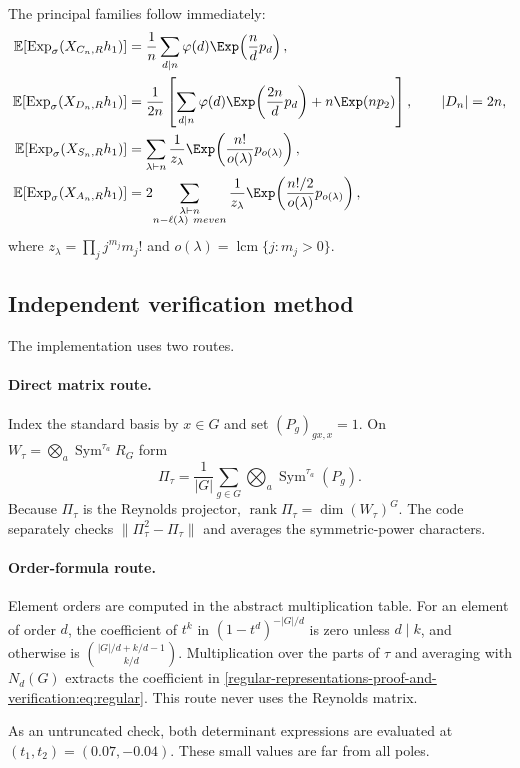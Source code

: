 \documentclass[10pt]{article}
\newcommand{\Sym}{\operatorname{Sym}}
\newcommand{\ExpS}{\operatorname{Exp}_{\sigma}}
\newcommand{\smgv}[2]{\mathbb E\!\left[\ExpS\!\left(X_{#1,#2}h_1\right)\right]}
\begin{document}
The principal families follow immediately:
\begin{align*}
 \smgv{C_n}{R}&=\frac1n\sum_{d\mid n}\varphi(d)
       \Exp\!\left(\frac ndp_d\right),\\
 \smgv{D_n}{R}&=\frac1{2n}\left[
   \sum_{d\mid n}\varphi(d)\Exp\!\left(\frac{2n}{d}p_d\right)
   +n\Exp(np_2)\right],\qquad |D_n|=2n,\\
 \smgv{S_n}{R}&=\sum_{\lambda\vdash n}\frac1{z_\lambda}
   \Exp\!\left(\frac{n!}{o(\lambda)}p_{o(\lambda)}\right),\\
 \smgv{A_n}{R}&=2\!\sum_{\substack{\lambda\vdash n\\n-\ell(\lambda)\ {
m even}}}
   \frac1{z_\lambda}
   \Exp\!\left(\frac{n!/2}{o(\lambda)}p_{o(\lambda)}\right),
\end{align*}
where $z_\lambda=\prod_jj^{m_j}m_j!$ and
$o(\lambda)=\operatorname{lcm}\{j:m_j>0\}$.

\subsection{Independent verification method}
The implementation uses two routes.

\paragraph{Direct matrix route.}
Index the standard basis by $x\in G$ and set
$(P_g)_{gx,x}=1$.  On
$W_\tau=\bigotimes_a\Sym^{\tau_a}R_G$ form
\[
 \Pi_\tau=\frac1{|G|}\sum_{g\in G}
     \bigotimes_a\Sym^{\tau_a}(P_g).
\]
Because $\Pi_\tau$ is the Reynolds projector,
$\operatorname{rank}\Pi_\tau=\dim(W_\tau)^G$.  The code separately checks
$\|\Pi_\tau^2-\Pi_\tau\|$ and averages the symmetric-power characters.

\paragraph{Order-formula route.}
Element orders are computed in the abstract multiplication table.  For an
element of order $d$, the coefficient of $t^k$ in
$(1-t^d)^{-|G|/d}$ is zero unless $d\mid k$, and otherwise is
$\binom{|G|/d+k/d-1}{k/d}$.  Multiplication over the parts of $\tau$ and
averaging with $N_d(G)$ extracts the coefficient in \eqref{regular-representations-proof-and-verification:eq:regular}.  This
route never uses the Reynolds matrix.

As an untruncated check, both determinant expressions are evaluated at
$(t_1,t_2)=(0.07,-0.04)$.  These small values are far from all poles.
\end{document}
